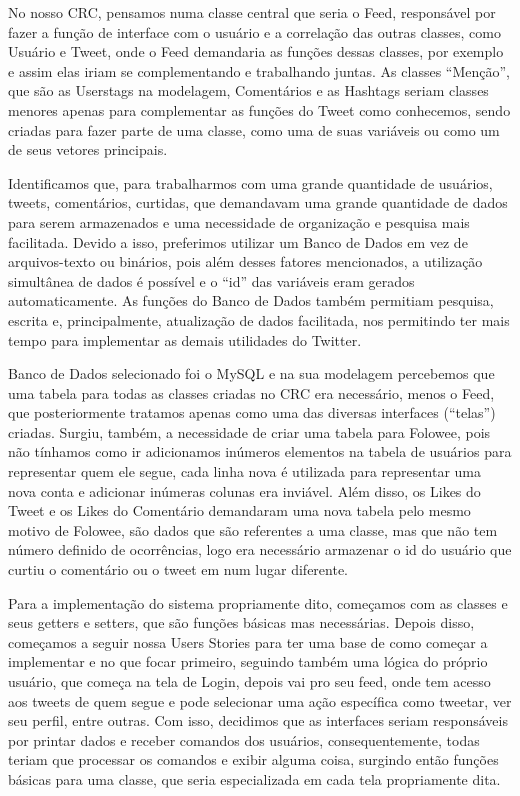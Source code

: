 No nosso C\+RC, pensamos numa classe central que seria o Feed, responsável por fazer a função de interface com o usuário e a correlação das outras classes, como Usuário e Tweet, onde o Feed demandaria as funções dessas classes, por exemplo e assim elas iriam se complementando e trabalhando juntas. As classes “\+Menção”, que são as Userstags na modelagem, Comentários e as Hashtags seriam classes menores apenas para complementar as funções do Tweet como conhecemos, sendo criadas para fazer parte de uma classe, como uma de suas variáveis ou como um de seus vetores principais.

Identificamos que, para trabalharmos com uma grande quantidade de usuários, tweets, comentários, curtidas, que demandavam uma grande quantidade de dados para serem armazenados e uma necessidade de organização e pesquisa mais facilitada. Devido a isso, preferimos utilizar um Banco de Dados em vez de arquivos-\/texto ou binários, pois além desses fatores mencionados, a utilização simultânea de dados é possível e o “id” das variáveis eram gerados automaticamente. As funções do Banco de Dados também permitiam pesquisa, escrita e, principalmente, atualização de dados facilitada, nos permitindo ter mais tempo para implementar as demais utilidades do Twitter.

Banco de Dados selecionado foi o My\+S\+QL e na sua modelagem percebemos que uma tabela para todas as classes criadas no C\+RC era necessário, menos o Feed, que posteriormente tratamos apenas como uma das diversas interfaces (“telas”) criadas. Surgiu, também, a necessidade de criar uma tabela para Folowee, pois não tínhamos como ir adicionamos inúmeros elementos na tabela de usuários para representar quem ele segue, cada linha nova é utilizada para representar uma nova conta e adicionar inúmeras colunas era inviável. Além disso, os Likes do Tweet e os Likes do Comentário demandaram uma nova tabela pelo mesmo motivo de Folowee, são dados que são referentes a uma classe, mas que não tem número definido de ocorrências, logo era necessário armazenar o id do usuário que curtiu o comentário ou o tweet em num lugar diferente.

Para a implementação do sistema propriamente dito, começamos com as classes e seus getters e setters, que são funções básicas mas necessárias. Depois disso, começamos a seguir nossa Users Stories para ter uma base de como começar a implementar e no que focar primeiro, seguindo também uma lógica do próprio usuário, que começa na tela de Login, depois vai pro seu feed, onde tem acesso aos tweets de quem segue e pode selecionar uma ação específica como tweetar, ver seu perfil, entre outras. Com isso, decidimos que as interfaces seriam responsáveis por printar dados e receber comandos dos usuários, consequentemente, todas teriam que processar os comandos e exibir alguma coisa, surgindo então funções básicas para uma classe, que seria especializada em cada tela propriamente dita.

